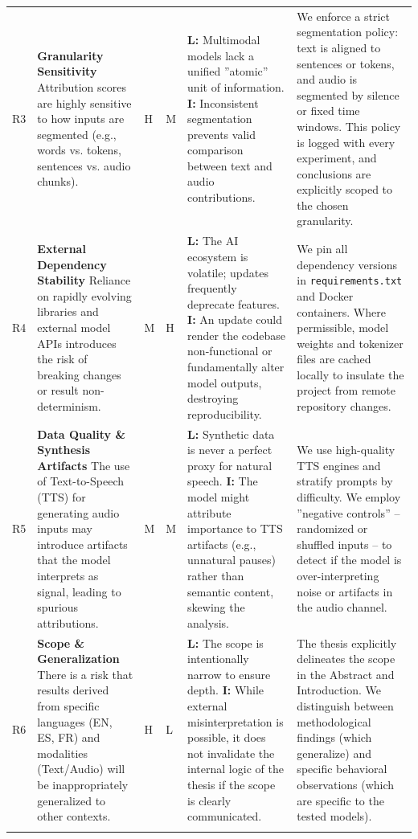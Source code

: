 \begin{appendices}
{\begin{longtable}{@{} p{0.3cm} p{4cm} p{0.2cm} p{0.2cm} p{4.6cm} p{4.6cm} @{}}
        R3 & \textbf{Granularity Sensitivity} \newline Attribution scores are highly sensitive to how inputs are segmented (e.g., words vs. tokens, sentences vs. audio chunks). & H & M & \textbf{L:} Multimodal models lack a unified ''atomic'' unit of information. \textbf{I:} Inconsistent segmentation prevents valid comparison between text and audio contributions. & We enforce a strict segmentation policy: text is aligned to sentences or tokens, and audio is segmented by silence or fixed time windows. This policy is logged with every experiment, and conclusions are explicitly scoped to the chosen granularity. \\
        \addlinespace

        R4 & \textbf{External Dependency Stability} \newline Reliance on rapidly evolving libraries and external model APIs introduces the risk of breaking changes or result non-determinism. & M & H & \textbf{L:} The AI ecosystem is volatile; updates frequently deprecate features. \textbf{I:} An update could render the codebase non-functional or fundamentally alter model outputs, destroying reproducibility. & We pin all dependency versions in \texttt{requirements.txt} and Docker containers. Where permissible, model weights and tokenizer files are cached locally to insulate the project from remote repository changes. \\
        \addlinespace

        R5 & \textbf{Data Quality \& Synthesis Artifacts} \newline The use of Text-to-Speech (TTS) for generating audio inputs may introduce artifacts that the model interprets as signal, leading to spurious attributions. & M & M & \textbf{L:} Synthetic data is never a perfect proxy for natural speech. \textbf{I:} The model might attribute importance to TTS artifacts (e.g., unnatural pauses) rather than semantic content, skewing the analysis. & We use high-quality TTS engines and stratify prompts by difficulty. We employ ''negative controls'' -- randomized or shuffled inputs -- to detect if the model is over-interpreting noise or artifacts in the audio channel. \\
        \addlinespace

        R6 & \textbf{Scope \& Generalization} \newline There is a risk that results derived from specific languages (EN, ES, FR) and modalities (Text/Audio) will be inappropriately generalized to other contexts. & H & L & \textbf{L:} The scope is intentionally narrow to ensure depth. \textbf{I:} While external misinterpretation is possible, it does not invalidate the internal logic of the thesis if the scope is clearly communicated. & The thesis explicitly delineates the scope in the Abstract and Introduction. We distinguish between methodological findings (which generalize) and specific behavioral observations (which are specific to the tested models). \\
        \addlinespace


\end{longtable}}
\end{appendices}
